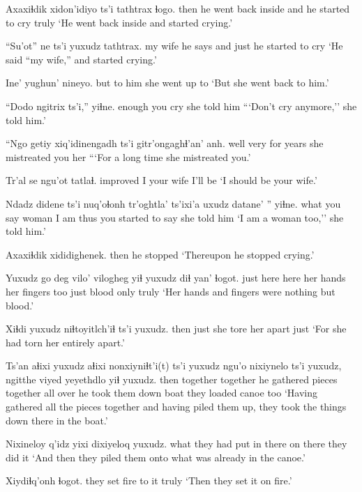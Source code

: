 \documentclass[12pt]{article}
\begin{document}
\gll Axaxiɬdik xidon'idiyo ts'i tathtrax ɬogo. 
then {he went back inside} and {he started to cry} truly 
\glt `He went back inside and started crying.'
\glend

\gll ``Su'ot'' ne ts'i yuxudz tathtrax. 
{my wife} {he says} and just {he started to cry}
\glt `He said ``my wife,'' and started crying.' 
\glend

\gll Ine' yughun' nineyo. 
but {to him} {she went up to}
\glt `But she went back to him.' 
\glend

\gll ``Dodo ngitrix ts'i,'' yiɬne. 
enough {you cry} {} {she told him}
\glt ```Don't cry anymore,'' she told him.' 
\glend

\gll ``Ngo getiy xiq'idinengadh ts'i gitr'ongaghɬ'an' anh. 
well very {for years} {} {she mistreated you} her
\glt ```For a long time she mistreated you.' 
\glend

\gll Tr'al se ngu'ot tatlaɬ. 
improved I {your wife} {I'll be}
\glt `I should be your wife.' 
\glend

\gll Ndadz didene ts'i nuq'oɬonh tr'oghtla' ts'ixi'a uxudz {datane' ''} yiɬne. 
what {you say} {} woman {I am} {} thus {you started to say} {she told him}
\glt `I am a woman too,'' she told him.' 
\glend

\gll Axaxiɬdik xididighenek.
then  {he stopped} 
\glt `Thereupon he stopped crying.' 
\glend

\gll Yuxudz go deg vilo' vilogheg yiɬ yuxudz diɬ yan' ɬogot. 
just here here {her hands} {her fingers} too just blood only truly
\glt `Her hands and fingers were nothing but blood.' 
\glend

\gll Xiɬdi yuxudz niɬtoyitlch'iɬ ts'i yuxudz. 
then just {she tore her apart} {} just
\glt `For she had torn her entirely apart.' 
\glend

\gll Ts'an aɬixi yuxudz aɬixi nonxiyniɬt'i(t) ts'i yuxudz ngu'o nixiynelo ts'i yuxudz, ngitthe viyed yeyethdlo yiɬ yuxudz. 
then together {} together {he gathered pieces together} {} all over {he took them} {} {} down boat {they loaded canoe} too
\glt `Having gathered all the pieces together and having piled them up, they took the things down there in the boat.' 
\glend

\gll Nixineloy q'idz yixi dixiyeloq yuxudz. 
{what they had put in there} on there {they did it} {} 
\glt `And then they piled them onto what was already in the canoe.'
\glend

\gll Xiydiɬq'onh ɬogot. 
{they set fire to it} truly
\glt `Then they set it on fire.' 
\glend
\end{document}
